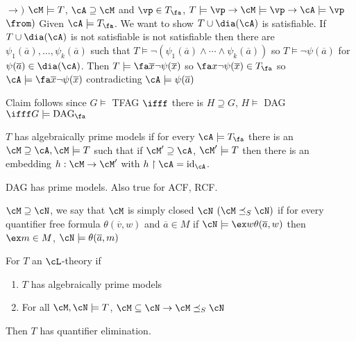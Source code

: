 \begin{pf}
    $\to )$ $\cM \models T$, $\cA \supseteq \cM$ and $\vp \in T_{\fa}$, $T \models \vp \to \cM \models \vp \to \cA \models \vp$ \\
    $\from )$ Given $\cA \models T_{\fa}$. We want to show $T \cup \dia(\cA)$ is satisfiable. If $T \cup \dia(\cA)$ is not satisfiable  is not satisfiable then there are $\psi_1(\overline{a}), \ldots, \psi_k(\overline{a})$ such that $T \models \neg(\psi_1(\overline{a}) \wedge \cdots \wedge \psi_k(\overline{a}))$ so $T \models \neg \psi(\overline{a})$ for $\psi(\overline{a}) \in \dia(\cA)$. Then $T \models \fa \overline{x} \neg \psi(\overline{x})$ so $\fa x \neg \psi(\overline{x}) \in T_{\fa}$ so $\cA \models \fa \overline{x} \neg \psi(\overline{x})$ contradicting $\cA \models \psi(\overline{a})$ 
\end{pf}

\noindent
Claim follows since $G \models$ TFAG $\ifff$ there is $H \supseteq G$, $H \models$ DAG $\ifff G \models \text{DAG}_{\fa}$ 

\begin{definition}
    $T$ has algebraically prime models if for every $\cA \models T_{\fa}$ there is an $\cM \supseteq \cA, \cM \models T$ such that if $\cM' \supseteq \cA$, $\cM' \models T$ then there is an embedding $h: \cM \to \cM'$ with $h \upharpoonright \cA = \text{id}_{\cA}$. 
\end{definition}

\noindent
DAG has prime models. Also true for ACF, RCF. 

\begin{definition}
    $\cM \supseteq \cN$, we say that $\cM$ is simply closed $\cN$ $(\cM \preceq_S \cN)$ if for every quantifier free formula $\theta(\overline{v}, w)$ and $\overline{a} \in M$ if $\cN \models \ex w \theta(\overline{a},w)$ then $\ex m \in M$, $\cN \models \theta(\overline{a},m)$ 
\end{definition}

\begin{theorem}
    For $T$ an $\cL$-theory if 
    \begin{enumerate}[label = (\roman*)]
        \item $T$ has algebraically prime models 
        \item For all $\cM, \cN \models T$, $\cM \subseteq \cN \to \cM \preceq_S \cN$ 
    \end{enumerate}
    Then $T$ has quantifier elimination. 
\end{theorem}
